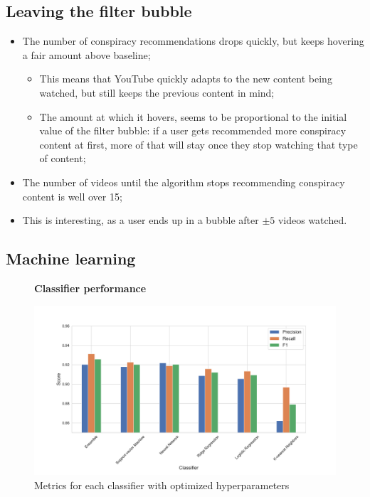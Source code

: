 \documentclass[../main.tex]{subfiles}
\begin{document}
\subsection{Leaving the filter bubble}

\begin{itemize}
    \item The number of conspiracy recommendations drops quickly, but keeps hovering a fair amount above baseline;
    \begin{itemize}
        \item This means that YouTube quickly adapts to the new content being watched, but still keeps the previous content in mind;
        \item The amount at which it hovers, seems to be proportional to the initial value of the filter bubble: if a user gets recommended more conspiracy content at first, more of that will stay once they stop watching that type of content; 
    \end{itemize}
    \item The number of videos until the algorithm stops recommending conspiracy content is well over 15;
    \item This is interesting, as a user ends up in a bubble after $\pm 5$ videos watched.
\end{itemize}

\subsection{Machine learning}

\begin{figure}[t!]
  \textbf{Classifier performance}\par\medskip
  \centering
  \includegraphics[keepaspectratio, width=\textwidth]{images/classifier_results.pdf}
  \caption{Metrics for each classifier with optimized hyperparameters}
  \label{fig:ML_scores}
\end{figure}
\end{document}

